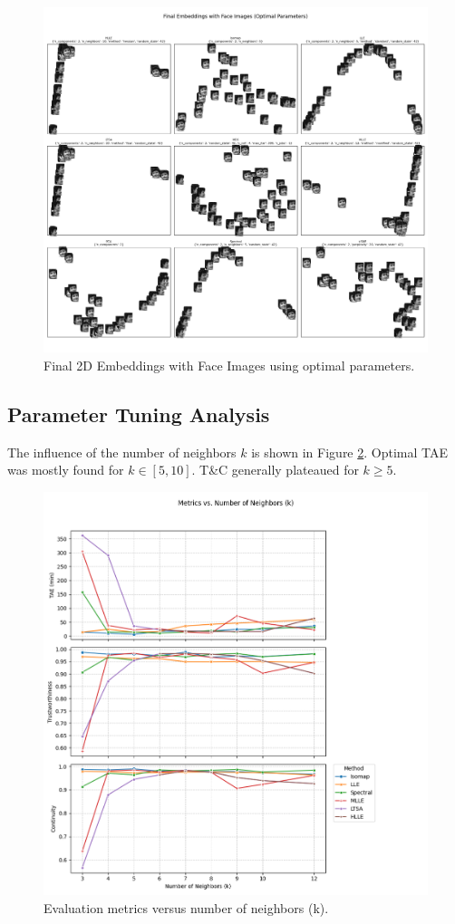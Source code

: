 \documentclass{article}
\begin{document}
\begin{figure}[htbp]
  \centering
  \includegraphics[width=0.8\linewidth]{../figs/final_images.png} %
  \caption{Final 2D Embeddings with Face Images using optimal parameters.}
  \label{fig:final_images}
\end{figure}


\subsection{Parameter Tuning Analysis}
\label{sec:tuning}
The influence of the number of neighbors $k$ is shown in Figure \ref{fig:tuning_k}. Optimal TAE was mostly found for $k \in [5, 10]$. T\&C generally plateaued for $k \ge 5$.

\begin{figure}[htbp]
  \centering
  \includegraphics[width=0.75\linewidth]{../figs/tuning_k.png} %
  \caption{Evaluation metrics versus number of neighbors (k).}
  \label{fig:tuning_k}
\end{figure}
\end{document}
